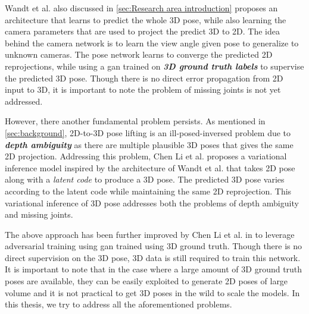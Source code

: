 Wandt et al. \cite{repnet} also discussed in \ref{sec:Research area introduction} proposes an architecture that learns to predict the whole 3D pose, while also learning the camera parameters that are used to project the predict 3D to 2D. The idea behind the camera network is to learn the view angle given pose to generalize to unknown cameras. The pose network learns to converge the predicted 2D reprojections, while using a \ac{gan} trained on \textit{\textbf{3D ground truth labels}} to supervise the predicted 3D pose. Though there is no direct error propagation from 2D input to 3D, it is important to note the problem of missing joints is not yet addressed. 

However, there another fundamental problem persists. As mentioned in \ref{sec:background}, 2D-to-3D pose lifting is an ill-posed-inversed problem due to \textit{\textbf{depth ambiguity}} as there are multiple plausible 3D poses that gives the same 2D projection. Addressing this problem, Chen Li et al. \cite{multiplehypo} proposes a variational inference model inspired by the architecture of Wandt et al. \cite{repnet} that takes 2D pose along with a \textit{latent code} to produce a 3D pose. The predicted 3D pose varies according to the latent code while maintaining the same 2D reprojection. This variational inference of 3D pose addresses both the problems of depth ambiguity and missing joints. 

The above approach has been further improved by Chen Li et al. in \cite{weaklymultiple} to leverage adversarial training using \ac{gan} trained using 3D ground truth. Though there is no direct supervision on the 3D pose, 3D data is still required to train this network. It is important to note that in the case where a large amount of 3D ground truth poses are available, they can be easily exploited to generate 2D poses of large volume and it is not practical to get 3D poses in the wild to scale the models. In this thesis, we try to address all the aforementioned problems.

